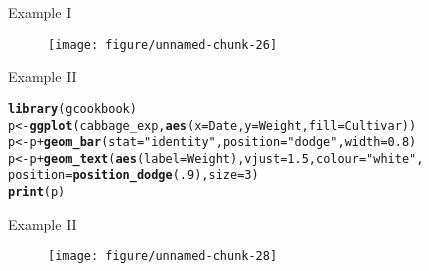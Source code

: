 \documentclass{beamer}\usepackage[]{graphicx}\usepackage[]{color}
\makeatletter
\def\maxwidth{ %
  \ifdim\Gin@nat@width>\linewidth
    \linewidth
  \else
    \Gin@nat@width
  \fi
}
\newcommand{\hlnum}[1]{\textcolor[rgb]{0.686,0.059,0.569}{#1}}%
\newcommand{\hlstr}[1]{\textcolor[rgb]{0.192,0.494,0.8}{#1}}%
\newcommand{\hlopt}[1]{\textcolor[rgb]{0,0,0}{#1}}%
\newcommand{\hlstd}[1]{\textcolor[rgb]{0.345,0.345,0.345}{#1}}%
\newcommand{\hlkwb}[1]{\textcolor[rgb]{0.69,0.353,0.396}{#1}}%
\newcommand{\hlkwc}[1]{\textcolor[rgb]{0.333,0.667,0.333}{#1}}%
\newcommand{\hlkwd}[1]{\textcolor[rgb]{0.737,0.353,0.396}{\textbf{#1}}}%
\newenvironment{kframe}{%
 \def\at@end@of@kframe{}%
 \ifinner\ifhmode%
  \def\at@end@of@kframe{\end{minipage}}%
  \begin{minipage}{\columnwidth}%
 \fi\fi%
 \def\FrameCommand##1{\hskip\@totalleftmargin \hskip-\fboxsep
 \colorbox{shadecolor}{##1}\hskip-\fboxsep
     \hskip-\linewidth \hskip-\@totalleftmargin \hskip\columnwidth}%
 \MakeFramed {\advance\hsize-\width
   \@totalleftmargin\z@ \linewidth\hsize
   \@setminipage}}%
 {\par\unskip\endMakeFramed%
 \at@end@of@kframe}
\newenvironment{knitrout}{}{} %
\makeatother
\begin{document}
\begin{frame}[containsverbatim]{Example I}
\begin{figure}[t]
\centering
\begin{knitrout}\footnotesize
{}\color{fgcolor}
\texttt{[image: figure/unnamed-chunk-26]} 

\end{knitrout}
\end{figure}
\end{frame}


\begin{frame}[containsverbatim]{Example II}
\begin{small}
\begin{knitrout}\footnotesize
{}\color{fgcolor}\begin{kframe}
\begin{alltt}
\hlkwd{library}\hlstd{(gcookbook)}
\hlstd{p} \hlkwb{<-} \hlkwd{ggplot}\hlstd{(cabbage_exp,} \hlkwd{aes}\hlstd{(}\hlkwc{x}\hlstd{=Date,} \hlkwc{y}\hlstd{=Weight,} \hlkwc{fill}\hlstd{=Cultivar))}
\hlstd{p} \hlkwb{<-} \hlstd{p} \hlopt{+} \hlkwd{geom_bar}\hlstd{(}\hlkwc{stat}\hlstd{=}\hlstr{"identity"}\hlstd{,} \hlkwc{position}\hlstd{=}\hlstr{"dodge"}\hlstd{,} \hlkwc{width}\hlstd{=}\hlnum{0.8}\hlstd{)}
\hlstd{p} \hlkwb{<-} \hlstd{p} \hlopt{+} \hlkwd{geom_text}\hlstd{(}\hlkwd{aes}\hlstd{(}\hlkwc{label}\hlstd{=Weight),} \hlkwc{vjust}\hlstd{=}\hlnum{1.5}\hlstd{,} \hlkwc{colour}\hlstd{=}\hlstr{"white"}\hlstd{,}
            \hlkwc{position}\hlstd{=}\hlkwd{position_dodge}\hlstd{(}\hlnum{.9}\hlstd{),} \hlkwc{size}\hlstd{=}\hlnum{3}\hlstd{)}
\hlkwd{print}\hlstd{(p)}
\end{alltt}
\end{kframe}
\end{knitrout}
\end{small}
\end{frame}

\begin{frame}[containsverbatim]{Example II}
\begin{figure}[t]
\centering
\begin{knitrout}\footnotesize
{}\color{fgcolor}
\texttt{[image: figure/unnamed-chunk-28]} 

\end{knitrout}
\end{figure}
\end{frame}
\end{document}
